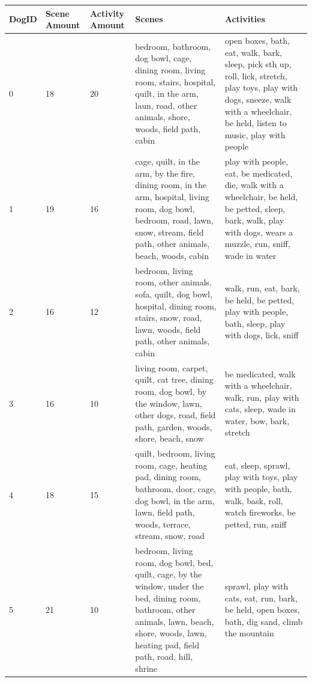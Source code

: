 \begin{table}[th]\scriptsize
\begin{center}
\begin{tabular}{l p{1cm} p{1cm} p{5cm} p{5cm}}
\hline
\textbf{DogID} & \textbf{Scene Amount} & \textbf{Activity Amount} & \textbf{Scenes} & \textbf{Activities}\\
\hline
0 & 18 & 20 & bedroom, bathroom, dog bowl, cage, dining room, living room, stairs, hospital, quilt, in the arm, laun, road, other animals, shore, woods, field path, cabin & open boxes, bath, eat, walk, bark, sleep, pick sth up, roll, lick, stretch, play toys, play with dogs, sneeze, walk with a wheelchair, be held, listen to music, play with people \\ \hline

1 & 19 & 16 & cage, quilt, in the arm, by the fire, dining room, in the arm, hospital, living room, dog bowl, bedroom, road, lawn, snow, stream, field path, other animals, beach, woods, cabin & play with people, eat, be medicated, die, walk with a wheelchair, be held, be petted, sleep, bark, walk, play with dogs, wears a muzzle, run, sniff, wade in water \\\hline

2 & 16 & 12 & bedroom, living room, other animals, sofa, quilt, dog bowl, hospital, dining room, stairs, snow, road, lawn, woods, field path, other animals, cabin & walk, run, eat, bark, be held, be petted, play with people, bath, sleep, play with dogs, lick, sniff\\\hline

3 & 16 & 10 & living room, carpet, quilt, cat tree, dining room, dog bowl, by the window, lawn, other dogs, road, field path, garden, woods, shore, beach, snow & be medicated, walk with a wheelchair, walk, run, play with cats, sleep, wade in water, bow, bark, stretch\\\hline

4 & 18 & 15 & quilt, bedroom, living room, cage, heating pad, dining room, bathroom, door, cage, dog bowl, in the arm, lawn, field path, woods, terrace, stream, snow, road & eat, sleep, sprawl, play with toys, play with people, bath, walk, bask, roll, watch fireworks, be petted, run, sniff\\\hline

5 & 21 & 10 & bedroom, living room, dog bowl, bed, quilt, cage, by the window, under the bed, dining room, bathroom, other animals, lawn, beach, shore, woods, lawn, heating pad, field path, road, hill, shrine & sprawl, play with cats, eat, run, bark, be held, open boxes, bath, dig sand, climb the mountain\\\hline


\end{tabular}
\end{center}
\end{table}
